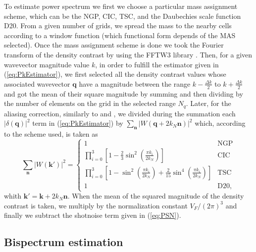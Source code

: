 \documentclass[a4paper,fleqn,usenatbib]{mnras}
\begin{document}
To estimate power spectrum we first we choose a particular mass assignment 
scheme, which can be the NGP, CIC, TSC, and the Daubechies scale function D20. 
From a given number of grids, we spread the mass to the nearby cells according 
to a window function (which functional form depends of the MAS selected). Once 
the mass assignment scheme is done we took the Fourier transform of the density 
contrast by using the FFTW3 library \citep{FFTW05}. Then, for a given 
wavevector magnitude value  $k$, in order to fulfill the estimator given in 
(\ref{eq:PkEstimator}), we first selected all the density contrast values whose 
associated wavevector $\mathbf{q}$ have a magnitude between the range 
$k-\frac{\Delta k}{2}$ to $k+\frac{\Delta k}{2}$ and got the mean of their 
square magnitude by summing and then dividing by the number of elements on the 
grid in the selected range $N_{q}$. Later, for the aliasing correction, 
similarly to \citet{Montesano2010} and \citet{Jeong2009}, we divided during the 
summation each $|\delta(\mathbf{q})|^2$ term in (\ref{eq:PkEstimator}) by 
$\sum_{\mathbf{n}} |W(\mathbf{q}+2 k_N \mathbf{n})|^2$ which, according to the 
scheme used, is taken as \citep{Jing2005,Cui2008}
\begin{equation}
  \sum_{\mathbf{n}} |W(\mathbf{k'})|^2=
  \begin{cases}
    1 & \text{NGP}\\
    \prod_{i=0}^3 
    \left[1-\frac{2}{3}\sin^2\left(\frac{\pi k_i}{2 k_N}\right)\right]& 
    \text{CIC}\\
    \prod_{i=0}^3 
    \left[1-
    \sin^2\left(\frac{\pi k_i}{2 k_N}\right)+
    \frac{2}{15}\sin^4\left(\frac{\pi k_i}{2 k_N}\right)\right]& 
    \text{TSC}\\
    1 & \text{D20},
  \end{cases}
\end{equation}
whith $\mathbf{k'}=\mathbf{k}+2 k_N \mathbf{n}$. 
When the mean of the squared magnitude of the density contrast is taken, we  
multiply by the normalization constant $V_F/(2\pi)^3$ and finally we subtract 
the shotnoise term given in (\ref{eq:PSN}).

\subsection{Bispectrum estimation}
\label{sec:methods:bk}
\end{document}
